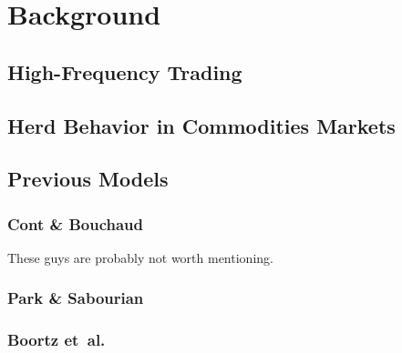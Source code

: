 \section{Background}
\label{background}

\subsection{High-Frequency Trading}

\subsection{Herd Behavior in Commodities Markets}

\subsection{Previous Models}
\subsubsection{Cont \& Bouchaud}
These guys are probably not worth mentioning.

\subsubsection{Park \& Sabourian}

\subsubsection{Boortz et~al.}



